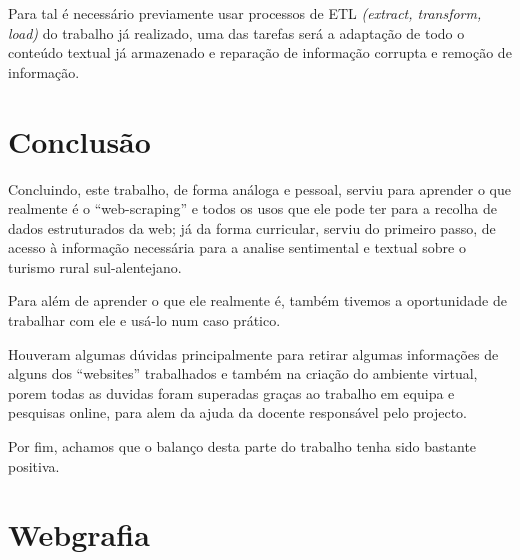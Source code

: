 \documentclass[a4paper,10pt]{article}
\begin{document}
Para tal é necessário previamente usar processos de ETL \textit{(extract, transform, load)} do trabalho já realizado, uma das tarefas será a adaptação de todo o conteúdo textual já armazenado e reparação de informação corrupta e remoção de informação.

\section{Conclusão}

Concluindo, este trabalho, de forma análoga e pessoal, serviu para aprender o que realmente é o ``web-scraping'' e todos os usos que ele pode ter para a recolha de dados estruturados da web; já da forma curricular, serviu do primeiro passo, de acesso à informação necessária para a analise sentimental e textual sobre o turismo rural sul-alentejano.

Para além de aprender o que ele realmente é, também tivemos a oportunidade de trabalhar com ele e usá-lo num caso prático.

Houveram algumas dúvidas principalmente para retirar algumas informações de alguns dos ``websites'' trabalhados e também na criação do ambiente virtual, porem todas as duvidas foram superadas graças ao trabalho em equipa e pesquisas online, para alem da ajuda da docente responsável pelo projecto.

Por fim, achamos que o balanço desta parte do trabalho tenha sido bastante positiva.

\section{Webgrafia}

\renewcommand{\bibsection}{}

\end{document}
